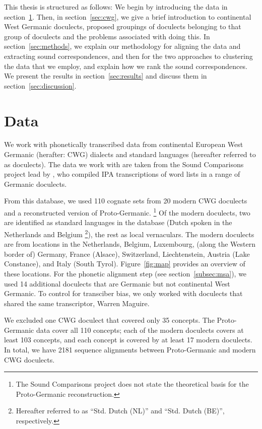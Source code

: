 \documentclass[a4paper]{article}
\begin{document}
This thesis is structured as follows:
We begin by introducing the data in section~\ref{sec:data}.
Then, in section~\ref{sec:cwg},
we give a brief introduction to continental West Germanic doculects,
proposed groupings of doculects belonging to that group of doculects
and the problems associated with doing this.
In section~\ref{sec:methods}, we explain our methodology for
aligning the data and extracting sound correspondences,
and then for the two approaches to clustering the data that we employ,
and explain how we rank the sound correspondences.
We present the results in section~\ref{sec:results}
and discuss them in section~\ref{sec:discussion}.

\section{Data}
\label{sec:data}

We work with phonetically transcribed data from
continental European West Germanic (herafter: CWG) dialects and standard languages
(hereafter referred to as doculects).
The data we work with are taken from the Sound Comparisons project
lead by \citet{heggarty2018sound}, who compiled IPA transcriptions of word lists
in a range of Germanic doculects.

From this database,
we used 110 cognate sets from 20 modern CWG doculects
and a reconstructed version of Proto-Germanic.
\footnote{
The Sound Comparisons project does not state
the theoretical basis for the Proto-Germanic reconstruction.
}
Of the modern doculects, two are identified as standard languages
in the database (Dutch spoken in the Netherlands and Belgium
\footnote{
Hereafter referred to as ``Std. Dutch (NL)'' and ``Std. Dutch (BE)'', respectively.
}),
the rest as local vernaculars.
The modern doculects are from locations in the
Netherlands, Belgium, Luxembourg, (along the Western border of) Germany,
France (Alsace), Switzerland, Liechtenstein, Austria (Lake Constance), and Italy (South Tyrol).
Figure~\ref{fig:map} provides an overview of these locations.
For the phonetic alignment step (see section~\ref{subsec:msa}),
we used 14 additional doculects that are Germanic but not continental West Germanic. 
To control for transciber bias, we only worked with doculects that shared the same transcriptor, Warren Maguire.

We excluded one CWG doculect that covered only 35 concepts. %
The Proto-Germanic data cover all 110 concepts; each of the modern doculects covers at least 103 concepts, and each concept is covered by at least 17 modern doculects.
In total, we have 2181 sequence alignments between Proto-Germanic and modern CWG doculects.
\end{document}

